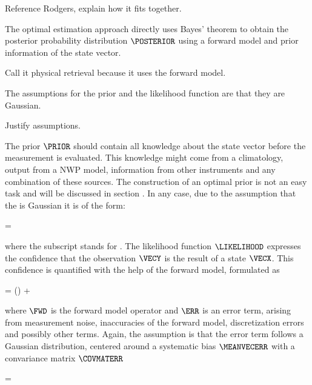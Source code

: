 \stopsection


\startsection[title={Optimal Estimation},reference=ch:optimalestimation]

    Reference Rodgers, explain how it fits together.

    The optimal estimation approach directly uses Bayes' theorem
     to obtain the posterior probability distribution
    $\POSTERIOR$ using a forward model and prior information of the state
    vector.

    Call it physical retrieval because it uses the forward model.

    The assumptions for the prior {\PDF} and the likelihood function
    are that they are Gaussian.

    Justify assumptions.

    The prior $\PRIOR$ should contain all knowledge about the state vector
    before the measurement is evaluated. This knowledge might come from
    a climatology, output from a NWP model, information from other instruments
    and any combination of these sources. The construction of an optimal prior
    is not an easy task and will be discussed in section
    . In any case, due to the assumption that the
    {\PDF} is Gaussian it is of the form:

    \startformula
        \PRIOR = \GAUSS{\VECX}{\MEANVECA}{\COVMATA} \EQCOMMA
    \stopformula

    where the subscript  stands for .  The likelihood
    function $\LIKELIHOOD$ expresses the confidence that the observation
    $\VECY$ is the result of a state $\VECX$. This confidence is quantified
    with the help of the forward model, formulated as

    \startformula
        \VECY = \FWD(\VECX) + \ERR \EQCOMMA
    \stopformula

    where $\FWD$ is the forward model operator and $\ERR$ is an error term,
    arising from measurement noise, inaccuracies of the forward model,
    discretization errors and possibly other terms. Again, the assumption is
    that the error term follows a Gaussian distribution, centered around
    a systematic bias $\MEANVECERR$ with a convariance matrix $\COVMATERR$

    \startformula
        \PROB{\ERR} = \GAUSS{\ERR}{\MEANVECERR}{\COVMATERR} \EQSTOP
    \stopformula

